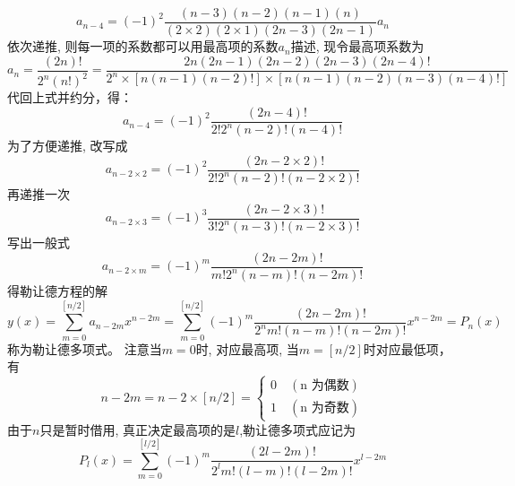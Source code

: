 		\begin{equation*}
			a_{n-4}=(-1)^2\frac{(n-3)(n-2)(n-1)(n)}{(2\times 2)(2\times 1)(2n-3)(2n-1)}a_{n}
		\end{equation*}	
		依次递推, 则每一项的系数都可以用最高项的系数$a_{n}$描述,
		现令最高项系数为 \[a_n=\frac{(2n)!}{2^n (n!)^2} = \frac{2n (2n-1)(2n-2)(2n-3)(2n-4)!}{2^n \times [n (n-1) (n-2)!]\times [n (n-1)  (n-2) (n-3) (n-4)!] } \]
		代回上式并约分，得：
		\begin{equation*}
			a_{n-4}=(-1)^2\frac{(2n-4)!}{2! 2^n (n-2)! (n-4)!}
		\end{equation*} 
		为了方便递推, 改写成
		\begin{equation*}
			a_{n-2\times 2}=(-1)^2\frac{(2 n-2\times 2) !}{2!2^{n}  (n-2) !(n-2\times 2) !}
		\end{equation*}	
		再递推一次
		\begin{equation*}
			a_{n-2\times 3}=(-1)^3\frac{(2 n-2\times 3) !}{3!2^{n}  (n-3) !(n-2\times 3) !}
		\end{equation*}	
		写出一般式
		\begin{equation*}
			a_{n-2 \times m}=(-1)^{m} \frac{(2 n-2 m) !}{m ! 2^{n} (n-m) !(n-2 m) !}
		\end{equation*}	
		得勒让德方程的解
		\begin{equation*}
			y(x)=\sum_{m=0}^{[n/2]}a_{n-2m} x^{n-2m} =\sum_{m=0}^{[n / 2]}(-1)^{m} \frac{(2 n-2 m) !}{2^{n} m !(n-m) !(n-2 m) !} x^{n-2 m} =P_{n}(x)
		\end{equation*}	
		称为勒让德多项式。 注意当$m=0$时, 对应最高项, 当$m=[n/2]$时对应最低项，有
		\[
		n-2m = n-2\times[n/2] =
		\begin{cases}
			0 \quad (\text{n 为偶数})\\
			1 \quad (\text{n 为奇数})
		\end{cases}
		\]
		由于$n$只是暂时借用, 真正决定最高项的是$l$,勒让德多项式应记为
		\begin{equation}\label{eq:Pl}
			\boxed{P_{l}(x)=\sum_{m=0}^{[l / 2]}(-1)^{m} \frac{(2 l-2 m) !}{2^{l} m !(l-m) !(l-2 m) !} x^{l-2 m}} 
		\end{equation}
	
	~~\\ 
	
